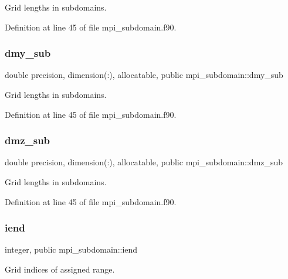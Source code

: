 Grid lengths in subdomains. 



Definition at line 45 of file mpi\+\_\+subdomain.\+f90.

\mbox{\label{namespacempi__subdomain_ae44efbff9669bfad03a79ab41b5e8ace}} 
\subsubsection{\texorpdfstring{dmy\_sub}{dmy\_sub}}
{\footnotesize\ttfamily double precision, dimension(\+:), allocatable, public mpi\+\_\+subdomain\+::dmy\+\_\+sub}



Grid lengths in subdomains. 



Definition at line 45 of file mpi\+\_\+subdomain.\+f90.

\mbox{\label{namespacempi__subdomain_afb6341d7362587d6fd0a06fe78ba4e3f}} 
\subsubsection{\texorpdfstring{dmz\_sub}{dmz\_sub}}
{\footnotesize\ttfamily double precision, dimension(\+:), allocatable, public mpi\+\_\+subdomain\+::dmz\+\_\+sub}



Grid lengths in subdomains. 



Definition at line 45 of file mpi\+\_\+subdomain.\+f90.

\mbox{\label{namespacempi__subdomain_abbd7d35107c53bcfd2b2b52771f4aa67}} 
\subsubsection{\texorpdfstring{iend}{iend}}
{\footnotesize\ttfamily integer, public mpi\+\_\+subdomain\+::iend}



Grid indices of assigned range. 




